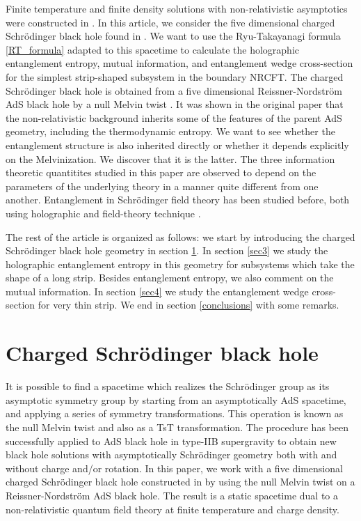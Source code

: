 \documentclass[12pt,a4paper]{article}
\numberwithin{equation}{section}
\begin{document}
Finite temperature and finite density solutions with non-relativistic asymptotics were constructed in \cite{Herzog:2008wg, Maldacena:2008wh, Adams:2008wt, Imeroni:2009cs,Adams:2009dm}. In this article, we consider the five dimensional charged Schr\"{o}dinger black hole found in \cite{Adams:2009dm}. We want to use the Ryu-Takayanagi formula \eqref{RT_formula} adapted to this spacetime to calculate the holographic entanglement entropy, mutual information, and entanglement wedge cross-section for the simplest strip-shaped subsystem in the boundary NRCFT. The charged Schr\"{o}dinger black hole is obtained from a five dimensional Reissner-Nordstr\"{o}m AdS black hole by a null Melvin twist \cite{Gimon:2003xk, Alishahiha:2003ru}. It was shown in the original paper \cite{Adams:2009dm} that the non-relativistic background inherits some of the features of the parent AdS geometry, including the thermodynamic entropy. We want to see whether the entanglement structure is also inherited directly or whether it depends explicitly on the Melvinization. We discover that it is the latter. The three information theoretic quantitites studied in this paper are observed to depend on the parameters of the underlying theory in a manner quite different from one another. Entanglement in Schr\"{o}dinger field theory has been studied before, both using holographic \cite{Kim:2012nb, Roychowdhury:2016wca} and field-theory technique \cite{Mintchev:2022xqh, Mintchev:2022yuo}. 

The rest of the article is organized as follows: we start by introducing the charged Schr\"{o}dinger black hole geometry in section \ref{sec2}. In section \ref{sec3} we study the holographic entanglement entropy in this geometry for subsystems which take the shape of a long strip. Besides entanglement entropy, we also comment on the mutual information. In section \ref{sec4} we study the entanglement wedge cross-section for very thin strip. We end in section \ref{conclusions} with some remarks.

\section{Charged Schr\"{o}dinger black hole} \label{sec2}

It is possible to find a spacetime which realizes the Schr\"{o}dinger group as its asymptotic symmetry group by starting from an asymptotically AdS spacetime, and applying a series of symmetry transformations. This operation is known as the null Melvin twist \cite{Gimon:2003xk, Alishahiha:2003ru} and also as a TsT transformation. The procedure has been successfully applied to AdS black hole in type-IIB supergravity to obtain new black hole solutions with asymptotically Schr\"{o}dinger geometry \cite{Maldacena:2008wh, Herzog:2008wg, Adams:2008wt, Imeroni:2009cs, Adams:2009dm} both with and without charge and/or rotation. In this paper, we work with a five dimensional charged Schr\"{o}dinger black hole constructed in \cite{Adams:2009dm} by using the null Melvin twist on a Reissner-Nordstr\"{o}m AdS black hole. The result is a static spacetime dual to a non-relativistic quantum field theory at finite temperature and charge density.
\end{document}
